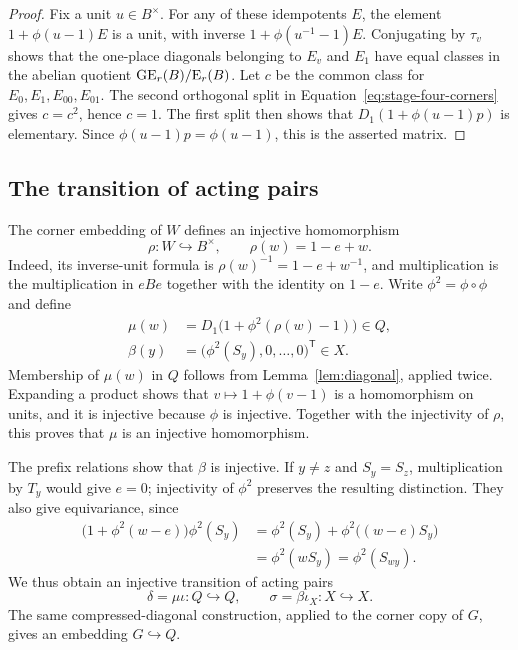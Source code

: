 \begin{proof}
Fix a unit $u\in B^\times$.  For any of these idempotents $E$,
the element $1+\phi(u-1)E$ is a unit, with inverse
$1+\phi(u^{-1}-1)E$.  Conjugating by $\tau_v$ shows that the
one-place diagonals belonging to $E_v$ and $E_1$ have equal classes
in the abelian quotient $\operatorname{GE}_r(B)/\mathrm E_r(B)$.
Let $c$ be the common class for $E_0,E_1,E_{00},E_{01}$.
The second orthogonal split in
Equation~\eqref{eq:stage-four-corners} gives $c=c^2$, hence $c=1$.
The first split then shows that
$D_1(1+\phi(u-1)p)$ is elementary.  Since
$\phi(u-1)p=\phi(u-1)$, this is the asserted matrix.
\end{proof}

\subsection{The transition of acting pairs}

The corner embedding of $W$ defines an injective homomorphism
\[
 \rho:W\hookrightarrow B^\times,
 \qquad \rho(w)=1-e+w.
\]
Indeed, its inverse-unit formula is
$\rho(w)^{-1}=1-e+w^{-1}$, and multiplication is the multiplication
in $eBe$ together with the identity on $1-e$.
Write $\phi^2=\phi\circ\phi$ and define
\begin{align}
 \mu(w)&=D_1\bigl(1+\phi^2(\rho(w)-1)\bigr)
        \in Q,\label{eq:stage-mu}\\
 \beta(y)&=\bigl(\phi^2(S_y),0,\ldots,0\bigr)^{\mathsf T}
        \in X.\label{eq:stage-beta}
\end{align}
Membership of $\mu(w)$ in $Q$ follows from
Lemma~\ref{lem:diagonal}, applied twice.  Expanding a product shows
that $v\mapsto1+\phi(v-1)$ is a homomorphism on units, and it is
injective because $\phi$ is injective.  Together with the injectivity
of $\rho$, this proves that $\mu$ is an injective homomorphism.

The prefix relations show that $\beta$ is injective.  If $y\ne z$
and $S_y=S_z$, multiplication by $T_y$ would give $e=0$;
injectivity of $\phi^2$ preserves the resulting distinction.
They also give equivariance, since
\begin{align*}
 \bigl(1+\phi^2(w-e)\bigr)\phi^2(S_y)
  &=\phi^2(S_y)+\phi^2\bigl((w-e)S_y\bigr)\\
  &=\phi^2(wS_y)
   =\phi^2(S_{wy}).
\end{align*}
We thus obtain an injective transition of acting pairs
\begin{equation}\label{eq:stage-transition}
 \delta=\mu\iota:Q\hookrightarrow Q,
 \qquad
 \sigma=\beta\iota_X:X\hookrightarrow X.
\end{equation}
The same compressed-diagonal construction, applied to the corner
copy of $G$, gives an embedding $G\hookrightarrow Q$.

